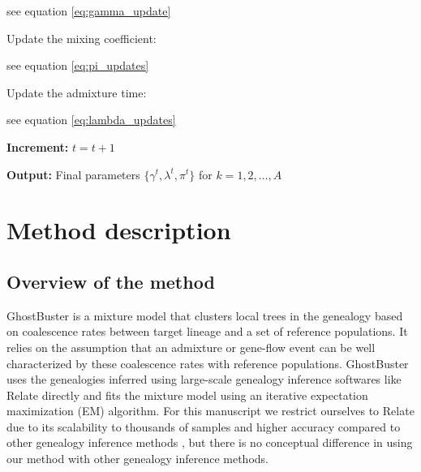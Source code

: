 \begin{algorithm}
\begin{algorithmic}[1]
        \hspace{7mm} see equation \ref{eq:gamma_update}

        \State Update the mixing coefficient:
        
        \hspace{7mm} see equation \ref{eq:pi_updates}
        
        \State Update the admixture time:
        
        \hspace{7mm} see equation \ref{eq:lambda_updates}
            
    \EndFor
    

    \State \textbf{Increment:} $t = t + 1$
    

\State \textbf{Output:} Final parameters $\{\gamma^{t}, \lambda^{t}, \pi^{t}\}$ for $k = 1, 2, \dots, A$

\end{algorithmic}
\end{algorithm}

\section{Method description}
\label{sec:ch2-gb-method}
\subsection{Overview of the method}

GhostBuster is a mixture model that clusters local trees in the genealogy based on coalescence rates between target lineage and a set of reference populations.
%
It relies on the assumption that an admixture or gene-flow event can be well characterized by these coalescence rates with reference populations.  
%
GhostBuster uses the genealogies inferred using large-scale genealogy inference softwares like Relate \cite{speidel2019method} directly and fits the mixture model using an iterative expectation maximization (EM) algorithm.
%
For this manuscript we restrict ourselves to Relate due to its scalability to thousands of samples and higher accuracy compared to other genealogy inference methods \cite{brandt2022evaluation}, but there is no conceptual difference in using our method with other genealogy inference methods.

